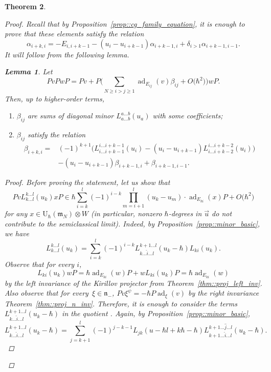 \documentclass[10pt,a4paper]{amsart}
\numberwithin{equation}{section}
\newtheorem{Theorem}{Theorem}[section]
\newtheorem{Lemma}[Theorem]{Lemma}
\newcommand{\U}{\mathrm{U}_{\hbar}}
\newcommand{\n}{\mathfrak{n}}
\newcommand{\m}{\mathfrak{m}}
\DeclareMathOperator{\ad}{ad}
\begin{document}
\begin{Theorem}
\begin{proof}
			Recall that by Proposition~\ref{prop::cg_family_equation}, it is enough to prove that these elements satisfy the relation
			\[
			\alpha_{i+k,i} = -E_{i,i+k-1} - (u_i-u_{i+k-1}) \alpha_{i+k-1,i} + \delta_{i > 1} \alpha_{i+k-1,i-1}.
			\]
			It will follow from the following lemma.
			\begin{Lemma}
				Let
				\[
				PvPwP = Pv + P\biggl( \sum\limits_{N \geq i > j \geq 1} \ad_{E_{ij}}(v) \beta_{ij} + O\bigl(\hbar^2\bigr)\biggr)wP.
				\]
				Then, up to higher-order terms,
				\begin{enumerate}\itemsep=0pt
					\item[$(1)$] $\beta_{ij}$ are sums of diagonal minor $L_{a\dots b}^{a\dots b}(u_a)$ with some coefficients;
					\item[$(2)$] $\beta_{ij}$ satisfy the relation
					\begin{align}
							\beta_{i+k,i} ={}& (-1)^{k+1}\bigl(L_{i\dots i+k-1}^{i\dots i+k-1}(u_i) - (u_i - u_{i+k-1}) L_{i \dots i+k-2}^{i \dots i+k-2}(u_i)\bigr)\nonumber \\
							&-(u_i - u_{i+k-1}) \beta_{i+k-1,i} + \beta_{i+k-1,i-1}.\label{eq::beta_relation}
					\end{align}
				\end{enumerate}
				\begin{proof}
					Before proving the statement, let us show that
					\[
					Pv L_{k\dots l}^{k \dots l}(u_k) x P \in \hbar \sum\limits_{i=k}^l (-1)^{i-k} \prod_{m=i+1}^l (u_k - u_m) \cdot \ad_{E_{ki}}(x) P + O\bigl(\hbar^2\bigr)
					\]
					for any $x\in \U(\m_N) \otimes W$ (in particular, nonzero $\hbar$-degrees in $\vec{u}$ do not contribute to the semiclassical limit). Indeed, by Proposition~\ref{prop::minor_basic}, we have
					\[
					L_{k \dots l}^{k \dots l}(u_k) = \sum\limits_{i=k}^l (-1)^{i-k} L_{k \dots \hat{i} \dots l}^{k+1 \dots l}(u_k-\hbar) L_{ki}(u_k).
					\]
					Observe that for every $i$,
					\[
					L_{ki}(u_k) wP = \hbar \ad_{E_{ki}}(w) P + wL_{ki}(u_k)P = \hbar \ad_{E_{ki}}(w)
					\]
					by the left invariance of the Kirillov projector from Theorem~\ref{thm::proj_left_inv}. Also observe that for every~${\xi \in \n_-}$,
					$
					Pv \xi^{\psi} = - \hbar P \ad_{\xi}(v)
					$
					by the right invariance Theorem~\ref{thm::proj_n_inv}. Therefore, it is enough to consider the terms $L_{k \dots \hat{i} \dots l}^{k+1 \dots l}(u_k-\hbar)$ in the quotient \smash{$\n_-^{\psi} \backslash \U(\m_N)$}. Again, by Proposition~\ref{prop::minor_basic},
					\[
					L_{k \dots \hat{i} \dots l}^{k+1 \dots l}(u_k-\hbar) = \sum\limits_{j=k+1}^l (-1)^{j-k-1} L_{jk}(u-\hbar l + k \hbar - \hbar) L_{k+1\dots \hat{i} \dots l}^{k+1\dots \hat{j} \dots l}(u_k - \hbar).
\]
\end{proof}
\end{Lemma}
\end{proof}
\end{Theorem}
\end{document}
